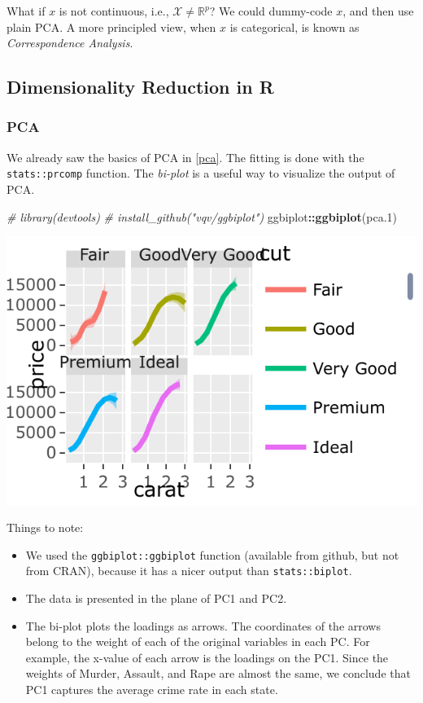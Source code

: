 \documentclass[]{book}
\newenvironment{Shaded}{\begin{snugshade}}{\end{snugshade}}
\newcommand{\CommentTok}[1]{\textcolor[rgb]{0.56,0.35,0.01}{\textit{#1}}}
\newcommand{\FloatTok}[1]{\textcolor[rgb]{0.00,0.00,0.81}{#1}}
\newcommand{\KeywordTok}[1]{\textcolor[rgb]{0.13,0.29,0.53}{\textbf{#1}}}
\newcommand{\NormalTok}[1]{#1}
\newcommand{\OperatorTok}[1]{\textcolor[rgb]{0.81,0.36,0.00}{\textbf{#1}}}
\providecommand{\tightlist}{%
  \setlength{\itemsep}{0pt}\setlength{\parskip}{0pt}}
\theoremstyle{definition}
\theoremstyle{definition}
\theoremstyle{definition}
\theoremstyle{remark}
\begin{document}
What if \(x\) is not continuous, i.e., \(\mathcal{X}\neq \mathbb{R}^p\)?
We could dummy-code \(x\), and then use plain PCA.
A more principled view, when \(x\) is categorical, is known as \emph{Correspondence Analysis}.

\hypertarget{dimensionality-reduction-in-r}{%
\subsection{Dimensionality Reduction in R}\label{dimensionality-reduction-in-r}}

\hypertarget{pca-in-r}{%
\subsubsection{PCA}\label{pca-in-r}}

We already saw the basics of PCA in \ref{pca}.
The fitting is done with the \texttt{stats::prcomp} function.
The \emph{bi-plot} is a useful way to visualize the output of PCA.

\begin{Shaded}
\begin{Highlighting}[]
\CommentTok{# library(devtools)}
\CommentTok{# install_github("vqv/ggbiplot")}
\NormalTok{ggbiplot}\OperatorTok{::}\KeywordTok{ggbiplot}\NormalTok{(pca}\FloatTok{.1}\NormalTok{) }
\end{Highlighting}
\end{Shaded}

\includegraphics[width=0.5\linewidth]{Rcourse_files/figure-latex/unnamed-chunk-252-1}

Things to note:

\begin{itemize}
\tightlist
\item
  We used the \texttt{ggbiplot::ggbiplot} function (available from github, but not from CRAN), because it has a nicer output than \texttt{stats::biplot}.
\item
  The data is presented in the plane of PC1 and PC2.
\item
  The bi-plot plots the loadings as arrows. The coordinates of the arrows belong to the weight of each of the original variables in each PC.
  For example, the x-value of each arrow is the loadings on the PC1.
  Since the weights of Murder, Assault, and Rape are almost the same, we conclude that PC1 captures the average crime rate in each state.
\end{itemize}
\end{document}
